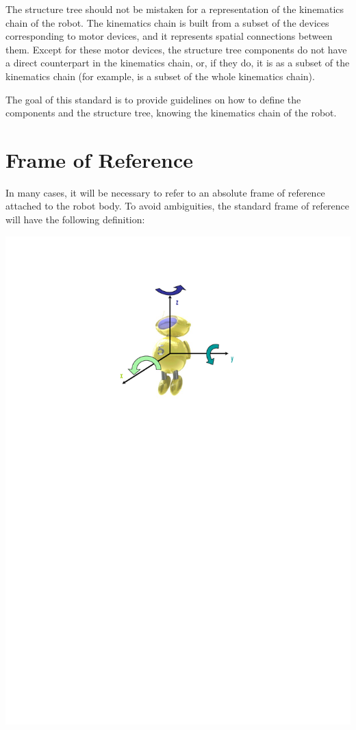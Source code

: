 The structure tree should not be mistaken for a representation of the
kinematics chain of the robot. The kinematics chain is built from a
subset of the devices corresponding to motor devices, and it
represents spatial connections between them. Except for these motor
devices, the structure tree components do not have a direct
counterpart in the kinematics chain, or, if they do, it is as a subset
of the kinematics chain (for example,  is a subset of the
whole kinematics chain).


The goal of this standard is to provide guidelines on how to define
the components and the structure tree, knowing the kinematics chain of
the robot.

\section{Frame of Reference}

In many cases, it will be necessary to refer to an absolute frame of
reference attached to the robot body. To avoid ambiguities, the
standard frame of reference will have the following definition:

\begin{center}
  \includegraphics{img/reference-frame}
\end{center}

